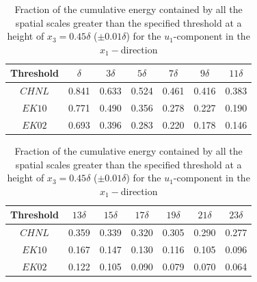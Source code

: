\documentclass{svjour3}                     %
\begin{document}
\begin{table}[!htb]
\centering
\caption{Fraction of the cumulative energy contained by all the spatial scales greater than the specified threshold at a height of $x_3=0.45\delta$ ($\pm 0.01\delta$) for the $u_1$-component in the $x_1-$direction}
\begin{tabular*}{0.99\textwidth}{ c@{\hskip 0.35in} c@{\hskip 0.35in} c@{\hskip 0.35in} c@{\hskip 0.35in} c@{\hskip 0.35in} c@{\hskip 0.35in} c@{\hskip 0.35in}}
\hline
\hline
 Threshold & $\delta$ & $3\delta$ & $5\delta$ & $7\delta$ & $9\delta$ & $11\delta$  \\
\hline 
$CHNL$ & 0.841 & 0.633 & 0.524 & 0.461 & 0.416 & 0.383  \\ 
$EK10$ & 0.771 & 0.490 & 0.356 & 0.278 & 0.227 & 0.190   \\ 
$EK02$ & 0.693 & 0.396 & 0.283 & 0.220 & 0.178 & 0.146   \\ 
\end{tabular*}
\label{tab:prcnt_cum_energy}
%
\begin{tabular*}{0.99\textwidth}{c@{\hskip 0.35in} c@{\hskip 0.35in} c@{\hskip 0.35in} c@{\hskip 0.35in} c@{\hskip 0.350in} c@{\hskip 0.350in}  c@{\hskip 0.35in} }
\hline

 Threshold & $13\delta$& $15\delta$ & $17\delta$ & $19\delta$ & $21\delta$ & $23\delta$  \\
\hline 
$CHNL$ & 0.359 & 0.339 & 0.320 & 0.305 & 0.290 & 0.277 \\
$EK10$ & 0.167 & 0.147 & 0.130  & 0.116 & 0.105 & 0.096  \\
$EK02$ & 0.122 & 0.105 & 0.090 & 0.079 & 0.070 & 0.064  \\
\hline 
\hline 
\end{tabular*}
\label{tab:prcnt_cum_energy}
\end{table}
\end{document}
